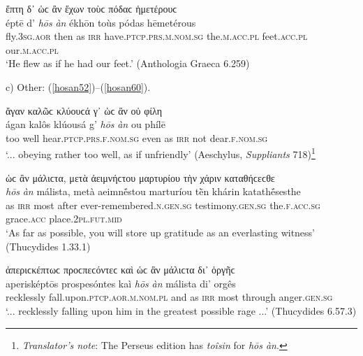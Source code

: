 \begin{exe}
\ex ἔπτη δ᾽ ὡϲ ἂν ἔχων τοὺϲ πόδαϲ ἡμετέρουϲ\\
\gll éptē d' \emph{hōs} \emph{àn} ékhōn toùs pódas hēmetérous\\
fly.\textsc{3sg.aor} then as \textsc{irr} have.\textsc{ptcp.prs.m.nom.sg} the.\textsc{m.acc.pl} feet.\textsc{acc.pl} our.\textsc{m.acc.pl}\\
\trans `He flew as if he had our feet.' (Anthologia Graeca 6.259)
\label{hosan51}
\end{exe}

c) Other: (\ref{hosan52})--(\ref{hosan60}).

\begin{exe}
\ex ἄγαν καλῶϲ κλύουϲά γ᾽ ὡϲ ἂν οὐ φίλη\\
\gll ágan kalôs klúousá g' \emph{hōs} \emph{àn} ou phílē\\
too well hear.\textsc{ptcp.prs.f.nom.sg} even as \textsc{irr} not dear.\textsc{f.nom.sg}\\
\trans `... obeying rather too well, as if unfriendly' (Aeschylus, \textit{Suppliants} 718)\footnote{\emph{Translator's note}: The Perseus edition has \textit{toîsin} for \textit{hōs àn}.}
\label{hosan52}
\end{exe}

\begin{exe}
\ex ὡϲ ἂν μάλιϲτα, μετὰ ἀειμνήϲτου μαρτυρίου τὴν χάριν καταθήϲεϲθε\\
\gll \emph{hōs} \emph{àn} málista, metà aeimnḗstou marturíou tḕn khárin katathḗsesthe\\
as \textsc{irr} most after ever-remembered.\textsc{n.gen.sg} testimony.\textsc{gen.sg} the.\textsc{f.acc.sg} grace.\textsc{acc} place.\textsc{2pl.fut.mid}\\
\trans `As far as possible, you will store up gratitude as an everlasting witness' (Thucydides 1.33.1)
\label{hosan53}
\end{exe}

\begin{exe}
\ex ἀπεριϲκέπτωϲ προϲπεϲόντεϲ καὶ ὡϲ ἂν μάλιϲτα δι᾽ ὀργῆϲ\\
\gll aperisképtōs prospesóntes kaì \emph{hōs} \emph{àn} málista di' orgês\\
recklessly fall.upon.\textsc{ptcp.aor.m.nom.pl} and as \textsc{irr} most through anger.\textsc{gen.sg}\\
\trans `... recklessly falling upon him in the greatest possible rage ...' (Thucydides 6.57.3)
\label{hosan54}
\end{exe}


